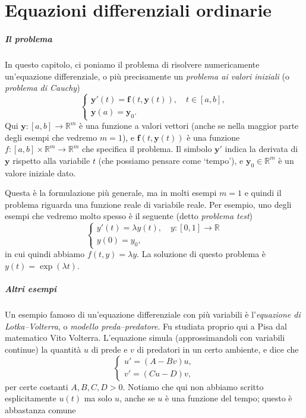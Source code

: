 \documentclass[a4paper]{report}
\theoremstyle{definiton}
\theoremstyle{remark}
\newcommand{\y}{\mathbf{y}}
\newcommand{\f}{\mathbf{f}}
\begin{document}
\chapter{Equazioni differenziali ordinarie}

\paragraph{Il problema} In questo capitolo, ci poniamo il problema di risolvere numericamente un'equazione differenziale, o più precisamente un \emph{problema ai valori iniziali} (o \emph{problema di Cauchy})
\begin{equation} \label{cauchy}
    \begin{cases}
    \y'(t) = \f(t, \y(t)), \quad t \in [a,b],\\
    \y(a) = \y_0.
    \end{cases}
\end{equation}
Qui $\y: [a,b]\to \mathbb{R}^m$ è una funzione a valori vettori (anche se nella maggior parte degli esempi che vedremo $m=1$), e $\f(t,\y(t))$ è una funzione $f:[a,b] \times \mathbb{R}^m \to \mathbb{R}^m$ che specifica il problema. Il simbolo $\y'$ indica la derivata di $\y$ rispetto alla variabile $t$ (che possiamo pensare come `tempo'), e $\y_0\in \mathbb{R}^m$ è un valore iniziale dato.

Questa è la formulazione più generale, ma in molti esempi $m=1$ e quindi il problema riguarda una funzione reale di variabile reale. Per esempio, uno degli esempi che vedremo molto spesso è il seguente (detto \emph{problema test})
\begin{equation} \label{testproblem}
    \begin{cases}
    y'(t) = \lambda y(t), \quad y: [0,1] \to \mathbb{R}\\  
    y(0) = y_0,
    \end{cases}
\end{equation}
in cui quindi abbiamo $f(t, y) = \lambda y$. La soluzione di questo problema è $y(t) = \exp( \lambda t)$.

\paragraph{Altri esempi}
Un esempio famoso di un'equazione differenziale con più variabili è l'\emph{equazione di Lotka--Volterra}, o \emph{modello preda--predatore}. Fu studiata proprio qui a Pisa dal matematico Vito Volterra. L'equazione simula (approssimandoli con variabili continue) la quantità $u$ di prede e $v$ di predatori in un certo ambiente, e dice che
\[
    \begin{cases}
        u' = (A-Bv)u,\\
        v' = (Cu-D)v,
    \end{cases}
\]
per certe costanti $A,B,C,D>0$. Notiamo che qui non abbiamo scritto esplicitamente $u(t)$ ma solo $u$, anche se $u$ è una funzione del tempo; questo è abbastanza comune
\end{document}
